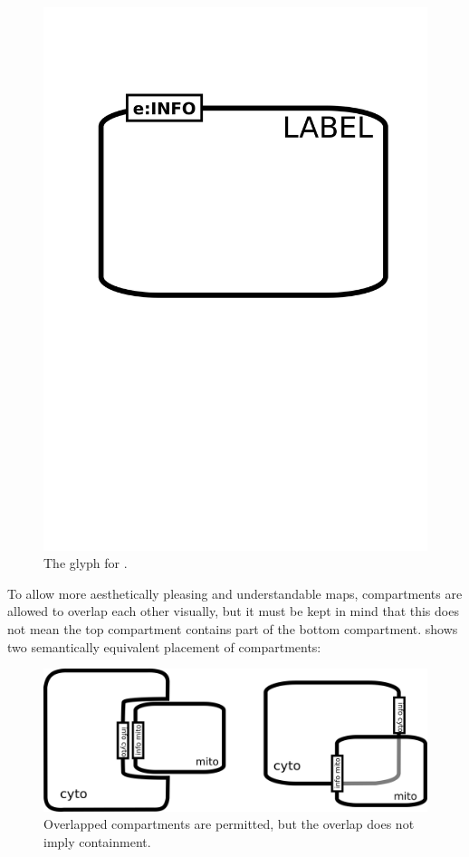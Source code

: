 \begin{figure}[htb]
  \centering
  \includegraphics[scale = 0.3]{images/compartment}
  \caption{The \PD glyph for .}
  \label{fig:techref:compartment}
\end{figure}


To allow more aesthetically pleasing and understandable maps, compartments are allowed to overlap each other visually, but it must be kept in mind that this does not mean the top compartment contains part of the bottom compartment.   shows two semantically equivalent placement of compartments:

\begin{figure}[htb]
  \centering
  \includegraphics[scale = 0.4]{examples/compartment_overlapping}
  \caption{Overlapped compartments are permitted, but the overlap does not imply containment.}
  \label{fig:techref:overlap}
\end{figure}

